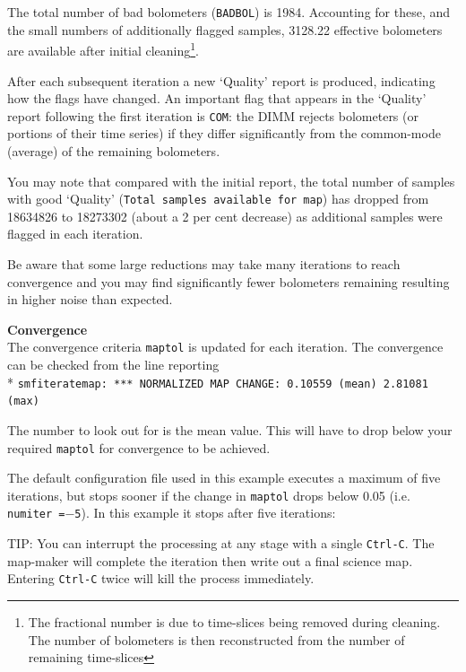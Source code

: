 \documentclass[twoside,11pt]{article}
\newenvironment{latexonly}{}{}
\renewcommand{\_}{\texttt{\symbol{95}}}
\newenvironment{fmpage}[1]{\begin{lrbox}{\fmbox}\begin{minipage}{#1}}{\end{minipage}\end{lrbox}\fbox{\usebox{\fmbox}}}
\begin{document}
The total number of bad bolometers (\texttt{BADBOL}) is 1984.
Accounting for these, and the small numbers of additionally flagged
samples, 3128.22 effective bolometers are available after initial
cleaning\footnote{The fractional number is due to time-slices being
removed during cleaning. The number of bolometers is then
reconstructed from the number of remaining time-slices}.

After each subsequent iteration a new `Quality' report is produced,
indicating how the flags have changed. An important flag that appears
in the `Quality' report following the first iteration is \texttt{COM}:
the DIMM rejects bolometers (or portions of their time series) if they
differ significantly from the common-mode (average) of the remaining
bolometers.

You may note that compared with the initial report, the total number of samples
with good `Quality' (\texttt{Total samples available for map}) has
dropped from 18634826 to 18273302 (about a 2 per cent decrease) as
additional samples were flagged in each iteration.

Be aware that some large reductions may take many iterations to reach
convergence and you may find significantly fewer bolometers remaining
resulting in higher noise than expected.

\textbf{Convergence}\\
The convergence criteria \texttt{maptol} is updated for each
iteration. The convergence can be checked from the line reporting\\*
\hspace*{0.5cm} \texttt{smf\_iteratemap: *** NORMALIZED MAP CHANGE:
0.10559 (mean) 2.81081 (max)}

The number to look out for is the mean value. This will have to drop
below your required \texttt{maptol} for convergence to be achieved.

The default configuration file used in this example executes a maximum
of five iterations, but stops sooner if the change in \texttt{maptol}
drops below 0.05 (i.e. \texttt{numiter~=$-$5}). In this example it
stops after five iterations:

\begin{latexonly}
\begin{center}
\begin{fmpage}{0.95\linewidth}
\vspace{0.1cm}
TIP: You can interrupt the processing at any stage with a
single \texttt{Ctrl-C}. The map-maker will complete the iteration then write
out a final science map. Entering \texttt{Ctrl-C} twice will
kill the process immediately.
\end{fmpage}
\end{center}
\end{latexonly}
\end{document}
